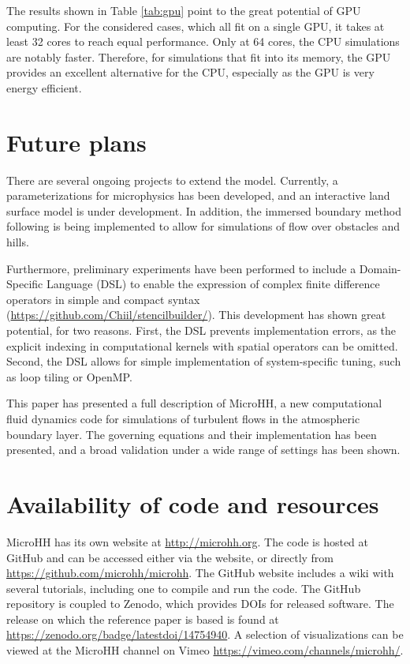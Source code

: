 \documentclass[gmd,manuscript]{copernicus}
\begin{document}
The results shown in Table \ref{tab:gpu} point to the great potential of GPU computing. For the considered cases, which all fit on a single GPU, it takes at least 32 cores to reach equal performance. Only at 64 cores, the CPU simulations are notably faster. Therefore, for simulations that fit into its memory, the GPU provides an excellent alternative for the CPU, especially as the GPU is very energy efficient.

\section{Future plans}\label{sec:future}
There are several ongoing projects to extend the model. Currently, a parameterizations for microphysics has been developed, and an interactive land surface model is under development. In addition, the immersed boundary method following \citet{Tseng2003} is being implemented to allow for simulations of flow over obstacles and hills.

Furthermore, preliminary experiments have been performed to include a Domain-Specific Language (DSL) to enable the expression of complex finite difference operators in simple and compact syntax (\url{https://github.com/Chiil/stencilbuilder/}). This development has shown great potential, for two reasons. First, the DSL prevents implementation errors, as the explicit indexing in computational kernels with spatial operators can be omitted. Second, the DSL allows for simple implementation of system-specific tuning, such as loop tiling or OpenMP.

\conclusions  \label{sec:conclusion} %
This paper has presented a full description of MicroHH, a new computational fluid dynamics code for simulations of turbulent flows in the atmospheric boundary layer. The governing equations and their implementation has been presented, and a broad validation under a wide range of settings has been shown.

\section{Availability of code and resources}\label{sec:howto}
MicroHH has its own website at \url{http://microhh.org}. The code is hosted at GitHub and can be accessed either via the website, or directly from 
\url{https://github.com/microhh/microhh}. The GitHub website includes a wiki with several tutorials, including one to compile and run the code. The GitHub repository is coupled to Zenodo, which provides DOIs for released software. The release on which the reference paper is based is found at \url{https://zenodo.org/badge/latestdoi/14754940}. A selection of visualizations can be viewed at the MicroHH channel on Vimeo \url{https://vimeo.com/channels/microhh/}.
\end{document}
